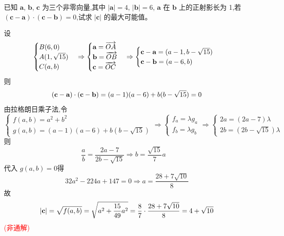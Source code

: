 \begin{questions}
    \question 已知 $\textbf{a}$, $\textbf{b}$, $\textbf{c}$ 为三个非零向量,其中 $|\textbf{a}|=4$, $|\textbf{b}|=6$, $\textbf{a}$ 在 $\textbf{b}$ 上的正射影长为 1,若 $(\textbf{c}-\textbf{a})\cdot(\textbf{c}-\textbf{b})=0$,试求 $|\textbf{c}|$ 的最大可能值。
    \begin{solution}
        设
        \[
        \begin{cases}
        B(6,0) \\
        A(1,\sqrt{15}) \\
        C(a,b)
        \end{cases}
        \Rightarrow
        \begin{cases}
        \textbf a = \overrightarrow{OA} \\
        \textbf b = \overrightarrow{OB} \\
        \textbf c = \overrightarrow{OC}
        \end{cases}
        \Rightarrow
        \begin{cases}
        \textbf c - \textbf a = (a-1, b - \sqrt{15}) \\
        \textbf c - \textbf b = (a - 6, b)
        \end{cases}
        \]
        则
        \[
        (\textbf c - \textbf a) \cdot (\textbf c - \textbf b) = (a - 1)(a - 6) + b(b - \sqrt{15}) = 0
        \]
        由拉格朗日乘子法,令
        \[
        \begin{cases}
        f(a,b) = a^2 + b^2 \\
        g(a,b) = (a - 1)(a - 6) + b(b - \sqrt{15})
        \end{cases}
        \Rightarrow
        \begin{cases}
        f_a = \lambda g_a \\
        f_b = \lambda g_b
        \end{cases}
        \Rightarrow
        \begin{cases}
        2a = (2a - 7)\lambda \\
        2b = (2b - \sqrt{15})\lambda
        \end{cases}
        \]
        则
        \[
        \frac{a}{b} = \frac{2a - 7}{2b - \sqrt{15}} \Rightarrow b = \frac{\sqrt{15}}{7} a \quad 
        \]
        代入 $g(a,b) = 0$得
        \[
        32a^2 - 224a + 147 = 0 \Rightarrow a = \frac{28 + 7\sqrt{10}}{8}
        \]
        故
        \[
        |\textbf c| = \sqrt{f(a,b)} = \sqrt{a^2 + \frac{15}{49}a^2} = \frac{8}{7} \cdot \frac{28 + 7\sqrt{10}}{8} = 4 + \sqrt{10}
        \]
        \textcolor{red}{(非通解)}
    \end{solution}


\end{questions}
